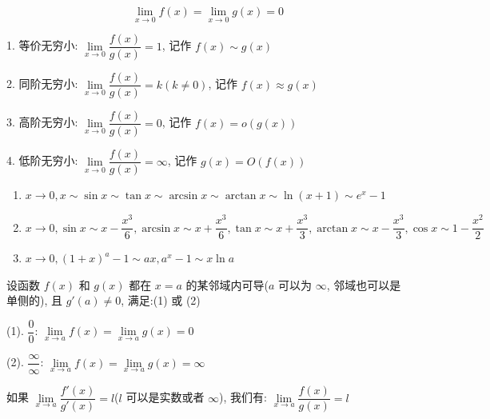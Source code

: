\begin{definition}[无穷小比阶]
	$$\lim\limits_{x\to 0}f(x)=\lim\limits_{x\to 0}g(x)=0$$

	1. 等价无穷小: $\lim\limits_{x\to 0}\dfrac{f(x)}{g(x)}=1$, 记作 $f(x)\sim g(x)$

	2. 同阶无穷小: $\lim\limits_{x\to 0}\dfrac{f(x)}{g(x)}=k(k\neq 0)$, 记作 $f(x)\approx g(x)$

	3. 高阶无穷小: $\lim\limits_{x\to 0}\dfrac{f(x)}{g(x)}=0$, 记作 $f(x)=o(g(x))$

	4. 低阶无穷小: $\lim\limits_{x\to 0}\dfrac{f(x)}{g(x)}=\infty$, 记作 $g(x)=O(f(x))$
\end{definition}

\begin{corollary}[等价无穷小]
	\begin{enumerate}
		\item $x\to 0, x\sim \sin x\sim \tan x\sim \arcsin x\sim \arctan x\sim \ln(x+1)\sim e^{x}-1$
		\item $x\to 0, \sin x\sim x - \dfrac{x^{3}}{6}, \arcsin x\sim x+\dfrac{x^{3}}{6}, \tan x\sim x+\dfrac{x^{3}}{3}, \arctan x\sim x-\dfrac{x^{3}}{3},\cos x\sim 1-\dfrac{x^{2}}{2}$
		\item $x\to 0, (1+x)^{a}-1\sim ax, a^{x}-1\sim x\ln a$
	\end{enumerate}
\end{corollary}
\begin{theorem}[洛必达法则]
	设函数 $f(x)$ 和 $g(x)$ 都在 $x=a$ 的某邻域内可导($a$ 可以为 $\infty$, 邻域也可以是单侧的), 且 $g'(a)\neq 0$, 满足:(1) 或 (2)

	(1). $\dfrac{0}{0}$: $\lim\limits_{x\to a}f(x)=\lim\limits_{x\to a}g(x)=0$

	(2). $\dfrac{\infty}{\infty}$: $\lim\limits_{x\to a}f(x)=\lim\limits_{x\to a}g(x)=\infty$

	如果 $\lim\limits_{x\to a}\dfrac{f'(x)}{g'(x)}=l$($l$ 可以是实数或者 $\infty$), 我们有: $\lim\limits_{x\to a}\dfrac{f(x)}{g(x)}=l$
\end{theorem}
